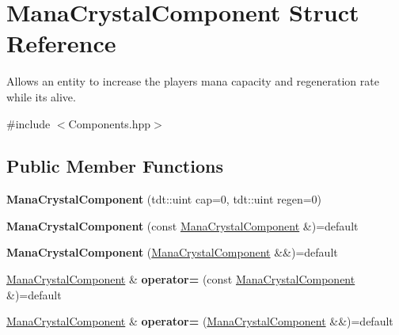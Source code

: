 \hypertarget{struct_mana_crystal_component}{}\section{Mana\+Crystal\+Component Struct Reference}
\label{struct_mana_crystal_component}


Allows an entity to increase the player\textquotesingle{}s mana capacity and regeneration rate while it\textquotesingle{}s alive.  




{\ttfamily \#include $<$Components.\+hpp$>$}

\subsection*{Public Member Functions}
\begin{DoxyCompactItemize}
\item 
{\bfseries Mana\+Crystal\+Component} (tdt\+::uint cap=0, tdt\+::uint regen=0)\hypertarget{struct_mana_crystal_component_a45c263468ad747e92812481a939ddab3}{}\label{struct_mana_crystal_component_a45c263468ad747e92812481a939ddab3}

\item 
{\bfseries Mana\+Crystal\+Component} (const \hyperlink{struct_mana_crystal_component}{Mana\+Crystal\+Component} \&)=default\hypertarget{struct_mana_crystal_component_ae9682d9623f228e9a3e852c5c481fac3}{}\label{struct_mana_crystal_component_ae9682d9623f228e9a3e852c5c481fac3}

\item 
{\bfseries Mana\+Crystal\+Component} (\hyperlink{struct_mana_crystal_component}{Mana\+Crystal\+Component} \&\&)=default\hypertarget{struct_mana_crystal_component_a627b4a2bb8ec1e463ef557719a2dc84f}{}\label{struct_mana_crystal_component_a627b4a2bb8ec1e463ef557719a2dc84f}

\item 
\hyperlink{struct_mana_crystal_component}{Mana\+Crystal\+Component} \& {\bfseries operator=} (const \hyperlink{struct_mana_crystal_component}{Mana\+Crystal\+Component} \&)=default\hypertarget{struct_mana_crystal_component_ad53a26c9d39195807cc66cf9386868b7}{}\label{struct_mana_crystal_component_ad53a26c9d39195807cc66cf9386868b7}

\item 
\hyperlink{struct_mana_crystal_component}{Mana\+Crystal\+Component} \& {\bfseries operator=} (\hyperlink{struct_mana_crystal_component}{Mana\+Crystal\+Component} \&\&)=default\hypertarget{struct_mana_crystal_component_a35e77965acae1f18700584340811580a}{}\label{struct_mana_crystal_component_a35e77965acae1f18700584340811580a}

\end{DoxyCompactItemize}
